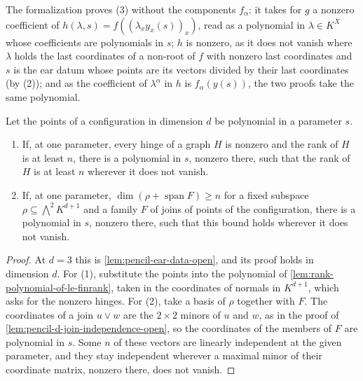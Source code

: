 \begin{fmlnote}
  The formalization proves (3) without the components $f_\alpha$: it
  takes for $g$ a nonzero coefficient of
  $h(\lambda, s) = f((\lambda_x y_x(s))_x)$, read as a polynomial in
  $\lambda \in K^X$ whose coefficients are polynomials in $s$; $h$ is
  nonzero, as it does not vanish where $\lambda$ holds the last
  coordinates of a non-root of $f$ with nonzero last coordinates and $s$
  is the ear datum whose points are its vectors divided by their last
  coordinates (by (2)); and as the coefficient of $\lambda^\alpha$ in $h$
  is $f_\alpha(y(s))$, the two proofs take the same polynomial.
\end{fmlnote}

\begin{lemma}
  \label{lem:pencil-d-ear-data-open}
  \leanok
  Let the points of a configuration in dimension $d$ be polynomial in a
  parameter $s$.
  \begin{enumerate}
    \item If, at one parameter, every hinge of a graph $H$ is nonzero and
      the rank of $H$ is at least $n$, there is a polynomial in $s$,
      nonzero there, such that the rank of $H$ is at least $n$ wherever
      it does not vanish.
    \item If, at one parameter, $\dim(\rho + \operatorname{span} F) \ge n$
      for a fixed subspace $\rho \subseteq \bigwedge^2 K^{d+1}$ and a
      family $F$ of joins of points of the configuration, there is a
      polynomial in $s$, nonzero there, such that this bound holds
      wherever it does not vanish.
  \end{enumerate}
\end{lemma}
\begin{proof}
  \leanok
  At $d = 3$ this is \cref{lem:pencil-ear-data-open}, and its proof holds
  in dimension $d$. For (1), substitute the points into the polynomial of
  \cref{lem:rank-polynomial-of-le-finrank}, taken in the coordinates of
  normals in $K^{d+1}$, which asks for the nonzero hinges. For (2), take
  a basis of $\rho$ together with $F$. The coordinates of a join
  $u \vee w$ are the $2 \times 2$ minors of $u$ and $w$, as in the proof
  of \cref{lem:pencil-d-join-independence-open}, so the coordinates of
  the members of $F$ are polynomial in $s$. Some $n$ of these vectors are
  linearly independent at the given parameter, and they stay independent
  wherever a maximal minor of their coordinate matrix, nonzero there,
  does not vanish.
\end{proof}

